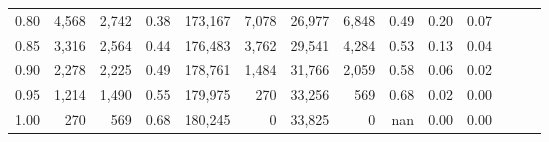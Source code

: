 \begin{tabular}{rrrrrrrrrrrrrr}
0.80 &   4,568 &  2,742 &  0.38 &  173,167 &    7,078 &  26,977 &   6,848 &  0.49 &  0.20 &      0.07 \\
0.85 &   3,316 &  2,564 &  0.44 &  176,483 &    3,762 &  29,541 &   4,284 &  0.53 &  0.13 &      0.04 \\
0.90 &   2,278 &  2,225 &  0.49 &  178,761 &    1,484 &  31,766 &   2,059 &  0.58 &  0.06 &      0.02 \\
0.95 &   1,214 &  1,490 &  0.55 &  179,975 &      270 &  33,256 &     569 &  0.68 &  0.02 &      0.00 \\
1.00 &     270 &    569 &  0.68 &  180,245 &        0 &  33,825 &       0 &   nan &  0.00 &      0.00 \\
\bottomrule
\end{tabular}
